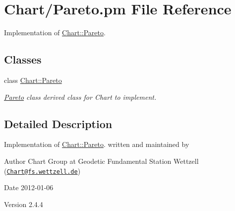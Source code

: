 \hypertarget{Pareto_8pm}{
\section{Chart/Pareto.pm File Reference}
\label{Pareto_8pm}
}


Implementation of \hyperlink{classChart_1_1Pareto}{Chart::Pareto}.  


\subsection*{Classes}
\begin{DoxyCompactItemize}
\item 
class \hyperlink{classChart_1_1Pareto}{Chart::Pareto}
\begin{DoxyCompactList}\small\item\em \hyperlink{classChart_1_1Pareto}{Pareto} class derived class for Chart to implement. \item\end{DoxyCompactList}\end{DoxyCompactItemize}


\subsection{Detailed Description}
Implementation of \hyperlink{classChart_1_1Pareto}{Chart::Pareto}. written and maintained by \begin{DoxyAuthor}{Author}
Chart Group at Geodetic Fundamental Station Wettzell (\href{mailto:Chart@fs.wettzell.de}{\tt Chart@fs.wettzell.de}) 
\end{DoxyAuthor}
\begin{DoxyDate}{Date}
2012-\/01-\/06 
\end{DoxyDate}
\begin{DoxyVersion}{Version}
2.4.4 
\end{DoxyVersion}
